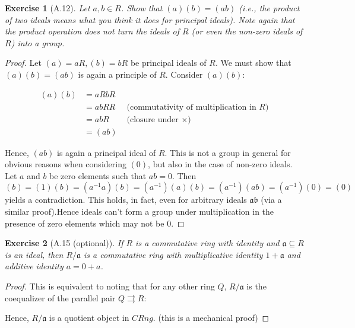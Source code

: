\documentclass[10pt]{article}
\newtheorem{exercise}{Exercise}
\newcommand{\ia}{\mathfrak{a}}
\newcommand{\ib}{\mathfrak{b}}
\newcommand{\qa}{R/\ia}
\newcommand{\seq}{\subseteq}
\begin{document}
\begin{exercise}[A.12]

Let $a, b \in R$. Show that $(a)(b) = (ab)$ (i.e., the product of two ideals means what you think it does for principal ideals). Note again that the product operation does not turn the ideals of $R$ (or even the non-zero ideals of $R$) into a group.

\end{exercise}

\begin{proof}
	Let $(a) = aR, (b) = bR$ be principal ideals of $R$. We must show that $(a)(b) = (ab)$ is again a principle of $R$. Consider $(a)(b)$: 

\begin{equation*}
	\begin{aligned}
		(a)(b) & = aRbR  \\
			 & = abRR & \text{ (commutativity of multiplication in $R$)}\\
			 & = abR & \text{ (closure under $\times$) } \\
			 & = (ab)
	\end{aligned}
\end{equation*}

Hence, $(ab)$ is again a principal ideal of $R$. This is not a group in general for obvious reasons when considering $(0)$, but also in the case of non-zero ideals. Let $a$ and $b$ be zero elements such that $ab = 0$. Then $(b) = (1)(b) = (a^{-1}a)(b) = (a^{-1})(a)(b) = (a^{-1})(ab) = (a^{-1})(0) = (0)$ yields a contradiction. This holds, in fact, even for arbitrary ideals $\ia\ib$ (via a similar proof).Hence ideals can't form a group under multiplication in the presence of zero elements which may not be 0.  
\end{proof}

\begin{exercise}[A.15 (optional)]
If $R$ is a commutative ring with identity and $\ia \seq R$ is an ideal, then $\qa$ is a commutative ring with multiplicative identity $1 + \ia$ and additive identity $a = 0 + a$.
\end{exercise}

\begin{proof}
	This is equivalent to noting that for any other ring $Q$,  $\qa$ is the coequalizer of the parallel pair $Q \rightrightarrows R$: 
	
	\begin{center}
	\end{center}
Hence, $\qa$ is a quotient object in $CRng$. (this is a mechanical proof)
\end{proof}
\end{document}
